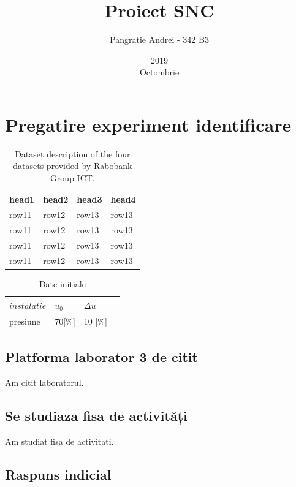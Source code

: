 \documentclass[12pt,english]{article}
\title{Proiect SNC}
\date{2019\\ Octombrie}
\author{Pangratie Andrei - 342 B3}
\begin{document}
\maketitle
\newpage

\tableofcontents
\newpage

\section {Pregatire experiment identificare }
\begin{table}[H]
  \centering
  \begin{tabular}{|l|l|l|l|}
    \hline
    head1 & head2 & head3 & head4 \\
    \hline
    row11 & row12 & row13 & row13 \\
    \hline
    row11 & row12 & row13 & row13 \\
    \hline
    row11 & row12 & row13 & row13 \\
    \hline
    row11 & row12 & row13 & row13 \\
    \hline
  \end{tabular}
  \caption{Dataset description of the four datasets provided by Rabobank Group ICT.}
\end{table}

\begin{table}[H]
  \centering
  \begin{tabular}{|l|l|l|l|}
    \hline
    $instalatie$ & $u_0$ & $\Delta u$ \\
    \hline
    presiune & 70[\%] & 10 [\%] \\
    \hline
  \end{tabular}
  \caption{Date initiale}
\end{table}

\subsection {Platforma laborator 3 de citit }
	Am citit laboratorul.

\subsection {Se studiaza fisa de activități }
	Am studiat fisa de activitati.

\subsection {Raspuns indicial }
\end{document}
